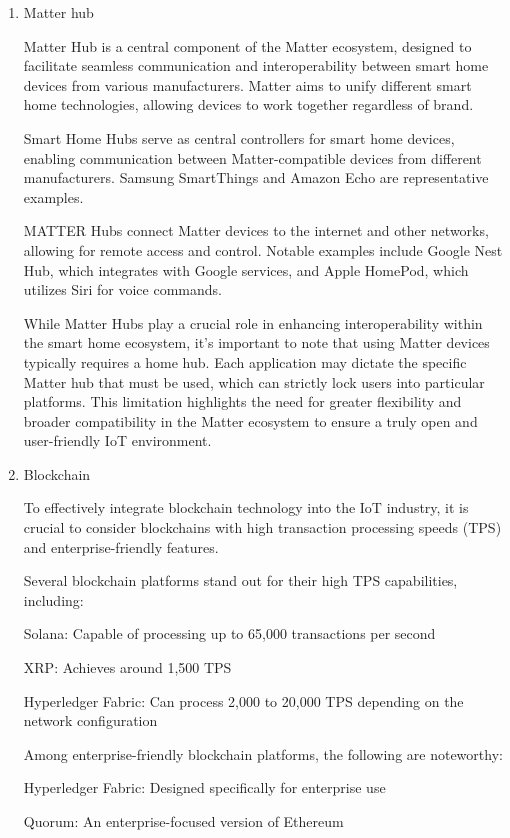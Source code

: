 \documentclass[conference]{IEEEtran}
\begin{document}
\begin{enumerate}[itemsep=2ex, parsep=1ex]
    \item Matter hub
    
    Matter Hub is a central component of the Matter ecosystem, designed to facilitate seamless communication and interoperability between smart home devices from various manufacturers. Matter aims to unify different smart home technologies, allowing devices to work together regardless of brand.
    
    Smart Home Hubs serve as central controllers for smart home devices, enabling communication between Matter-compatible devices from different manufacturers. Samsung SmartThings and Amazon Echo are representative examples.
    
    MATTER Hubs connect Matter devices to the internet and other networks, allowing for remote access and control. Notable examples include Google Nest Hub, which integrates with Google services, and Apple HomePod, which utilizes Siri for voice commands.
    
    While Matter Hubs play a crucial role in enhancing interoperability within the smart home ecosystem, it's important to note that using Matter devices typically requires a home hub. Each application may dictate the specific Matter hub that must be used, which can strictly lock users into particular platforms. This limitation highlights the need for greater flexibility and broader compatibility in the Matter ecosystem to ensure a truly open and user-friendly IoT environment.

    \item Blockchain
    
    To effectively integrate blockchain technology into the IoT industry, it is crucial to consider blockchains with high transaction processing speeds (TPS) and enterprise-friendly features. 
    
    Several blockchain platforms stand out for their high TPS capabilities, including:
    
	Solana: Capable of processing up to 65,000 transactions per second
 
	XRP: Achieves around 1,500 TPS
 
	Hyperledger Fabric: Can process 2,000 to 20,000 TPS depending on the network configuration
 
    Among enterprise-friendly blockchain platforms, the following are noteworthy:
    
    	Hyperledger Fabric: Designed specifically for enterprise use
     
    	Quorum: An enterprise-focused version of Ethereum
     

\end{enumerate}
\end{document}
